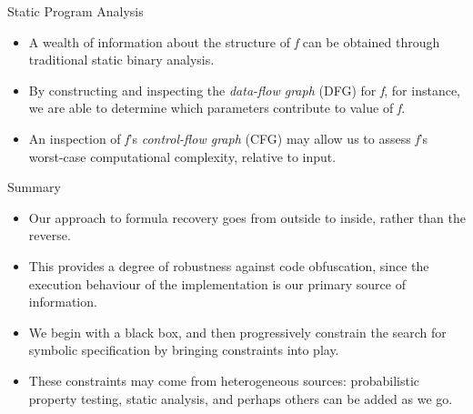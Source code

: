 \documentclass[presentation]{beamer}
\begin{document}
\begin{frame}[label={sec:org00a1631}]{Static Program Analysis}
\begin{itemize}
\item A wealth of information about the structure of \emph{f} can be obtained through traditional static binary analysis.
\item By constructing and inspecting the \emph{data-flow graph} (DFG) for \emph{f}, for instance, we are able to determine which parameters contribute to value of \emph{f}.
\item An inspection of \emph{f}'s \emph{control-flow graph} (CFG) may allow us to assess \emph{f}'s worst-case computational complexity, relative to input.
\end{itemize}
\end{frame}

\begin{frame}[label={sec:org81de236}]{Summary}
\begin{itemize}
\item Our approach to formula recovery goes from \alert{outside} to \alert{inside}, rather than the reverse.
\item This provides a degree of robustness against code obfuscation, since the \alert{execution behaviour} of the implementation is our primary source of information.
\item We begin with a black box, and then progressively \alert{constrain} the search for symbolic specification by bringing constraints into play.
\item These constraints may come from \alert{heterogeneous} sources: probabilistic property testing, static analysis, and perhaps others can be added as we go.
\end{itemize}
\end{frame}
\end{document}
